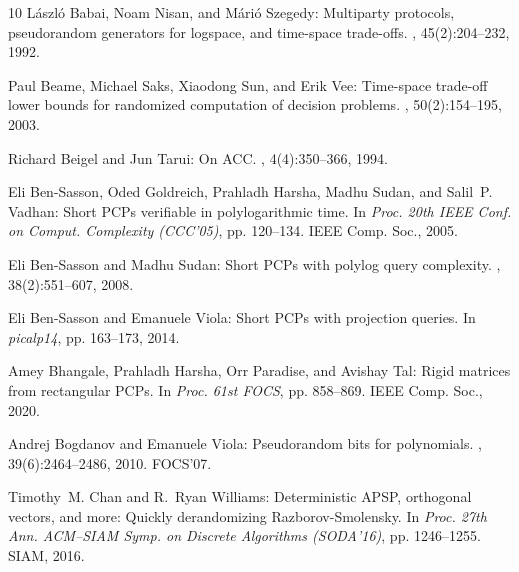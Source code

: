 \documentclass[11pt]{article}
\begin{document}
\begin{thebibliography}{10}
{\sc L{\'a}szl{\'o} Babai, Noam Nisan, and M{\'a}ri{\'o} Szegedy}: Multiparty
  protocols, pseudorandom generators for logspace, and time-space trade-offs.
, 45(2):204--232, 1992.
\newblock [\epfmtdoi{10.1016/0022-0000(92)90047-M}]

{\sc Paul Beame, Michael Saks, Xiaodong Sun, and Erik Vee}: Time-space
  trade-off lower bounds for randomized computation of decision problems.
, 50(2):154--195, 2003.
\newblock [\epfmtdoi{10.1145/636865.636867}]

{\sc Richard Beigel and Jun Tarui}: On {ACC}.
, 4(4):350--366, 1994.
\newblock [\epfmtdoi{10.1007/BF01263423}]

{\sc Eli {Ben-Sasson}, Oded Goldreich, Prahladh Harsha, Madhu Sudan, and
  Salil~P. Vadhan}: Short {PCPs} verifiable in polylogarithmic time.
\newblock In {\em Proc. 20th IEEE Conf. on Comput. Complexity (CCC'05)}, pp.
  120--134. IEEE Comp. Soc., 2005.

{\sc Eli {Ben-Sasson} and Madhu Sudan}: Short {PCPs} with polylog query
  complexity.
, 38(2):551--607, 2008.
\newblock [\epfmtdoi{10.1137/050646445}]

{\sc Eli {Ben-Sasson} and Emanuele Viola}: Short {PCPs} with projection
  queries.
\newblock In {\em picalp14}, pp. 163--173, 2014.
\newblock [\epfmtdoi{10.1007/978-3-662-43948-7\_14}]

{\sc Amey Bhangale, Prahladh Harsha, Orr Paradise, and Avishay Tal}: Rigid
  matrices from rectangular {PCP}s.
\newblock In {\em Proc. 61st FOCS}, pp. 858--869. IEEE Comp. Soc., 2020.

{\sc Andrej Bogdanov and Emanuele Viola}: Pseudorandom bits for polynomials.
, 39(6):2464--2486, 2010.
\newblock \prelim FOCS'07.
\newblock [\epfmtdoi{10.1137/070712109}]

{\sc Timothy~M. Chan and R.~Ryan Williams}: Deterministic {APSP}, orthogonal
  vectors, and more: {Q}uickly derandomizing {R}azborov-{S}molensky.
\newblock In {\em Proc. 27th Ann. ACM--SIAM Symp. on Discrete Algorithms
  (SODA'16)}, pp. 1246--1255. SIAM, 2016.
\newblock [\epfmtdoi{10.1137/1.9781611974331.87}]


\end{thebibliography}
\end{document}
